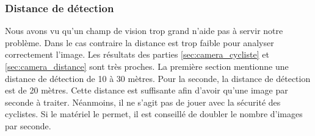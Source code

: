\subsubsection*{Distance de détection}
Nous avons vu qu'un champ de vision trop grand n'aide pas à servir notre problème. Dans le cas contraire la distance est trop faible pour analyser correctement l'image.
Les résultats des parties \ref{sec:camera_cycliste} et \ref{sec:camera_distance} sont très proches.
La première section mentionne une distance de détection de 10 à 30 mètres. Pour la seconde, la distance de détection est de 20 mètres.
Cette distance est suffisante afin d'avoir qu'une image par seconde à traiter. Néanmoins, il ne s'agit pas de jouer avec la sécurité des cyclistes.
Si le matériel le permet, il est conseillé de doubler le nombre d'images par seconde.
